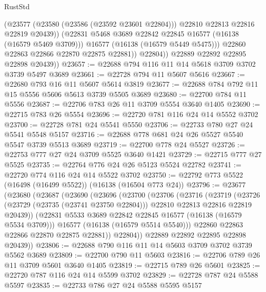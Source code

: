 \begin{lexlean}{RustStd}
\begin{coremodule}
                    (@23577
                      (@23580 (@23586 (@23592 @23601 @22804)))
                      @22810
                      @22813
                      @22816
                      @22819
                      @20439))
                  (@22831 @5468 @3689 @22842 @22845 @16577 (@16138 (@16579 @5469 @3709)))
                  @16577
                  (@16138 (@16579 @5449 @5475)))
                @22860
                @22863
                @22866
                @22870
                @22875
                @22881))
            @22804))
        @22889
        @22892
        @22895
        @22898
        @20439))
@23657 := @22688 @794 @116 @11 @14 @5618 @3709 @3702 @3739 @5497 @3689
@23661 := @22728 @794 @11 @5607 @5616
@23667 := @22680 @793 @16 @11 @5607 @5614 @3819
@23677 := @22688 @784 @792 @11 @15 @5556 @5606 @5613 @3739 @5505 @3689
@23680 := @22700 @784 @11 @5556
@23687 := @22706 @783 @26 @11 @3709 @5554 @3640 @1405
@23690 := @22715 @783 @26 @5554
@23696 := @22720 @781 @116 @24 @14 @5552 @3702
@23700 := @22728 @781 @24 @5541 @5550
@23706 := @22733 @780 @27 @24 @5541 @5548 @5157
@23716 := @22688 @778 @681 @24 @26 @5527 @5540 @5547 @3739 @5513 @3689
@23719 := @22700 @778 @24 @5527
@23726 := @22753 @777 @27 @24 @3709 @5525 @3640 @1421
@23729 := @22715 @777 @27 @5525
@23735 := @22764 @776 @24 @26 @5123 @5524 @22782
@23741 := @22720 @774 @116 @24 @14 @5522 @3702
@23750 := @22792 @773 @5522 (@16498 (@16499 @5522)) (@16138 (@16504 @773 @24))
@23796 := @23677
    (@23680
      (@23687
        (@23690
          (@23696
            (@23700
              (@23706
                (@23716
                  (@23719
                    (@23726
                      (@23729 (@23735 (@23741 @23750 @22804)))
                      @22810
                      @22813
                      @22816
                      @22819
                      @20439))
                  (@22831 @5533 @3689 @22842 @22845 @16577 (@16138 (@16579 @5534 @3709)))
                  @16577
                  (@16138 (@16579 @5514 @5540)))
                @22860
                @22863
                @22866
                @22870
                @22875
                @22881))
            @22804))
        @22889
        @22892
        @22895
        @22898
        @20439))
@23806 := @22688 @790 @116 @11 @14 @5603 @3709 @3702 @3739 @5562 @3689
@23809 := @22700 @790 @11 @5603
@23816 := @22706 @789 @26 @11 @3709 @5601 @3640 @1405
@23819 := @22715 @789 @26 @5601
@23825 := @22720 @787 @116 @24 @14 @5599 @3702
@23829 := @22728 @787 @24 @5588 @5597
@23835 := @22733 @786 @27 @24 @5588 @5595 @5157

\end{coremodule}
\end{lexlean}
